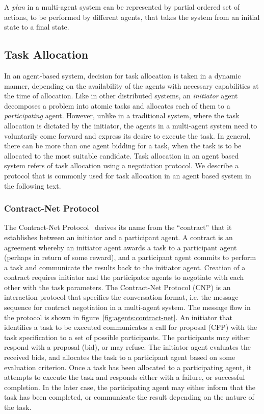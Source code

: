 \begin{definition}
A {\em plan} in a multi-agent system can be represented by partial ordered set of actions, to be performed by different agents, that 
takes the system from an initial state to a final state. 
\end{definition}

\subsection{Task Allocation}
\label{sec:agents:tasks}

In an agent-based system, decision for task allocation is taken in a dynamic manner, depending on the availability of the
agents with necessary capabilities at the time of allocation. Like in other distributed systems, an {\em initiator} agent
decomposes a problem into atomic tasks and allocates each of them to a {\em participating} agent. However, unlike in a 
traditional system, where the task allocation is dictated by the initiator, the agents in a multi-agent system need to 
voluntarily come forward and express its desire to execute the task. In general, there can be more than one agent bidding 
for a task, when the task is to be allocated to the most suitable candidate. Task allocation in an agent based system refers 
of task allocation using a negotiation protocol.
We describe a protocol that is commonly used for task allocation in an agent based system in the following text. 


\subsubsection*{Contract-Net Protocol}

The Contract-Net Protocol~\citep{Smith:1980} derives its name from the ``contract'' that it establishes between an initiator
and a participant agent. A contract is an agreement whereby an initiator agent awards a task to a participant agent (perhaps
in return of some reward), and a participant agent commits to perform a task and communicate the results back to the initiator 
agent. Creation of a contract requires initiator and the participator agents to negotiate with each other with the task parameters. 
The Contract-Net Protocol (CNP) is an interaction protocol that specifies the conversation format, i.e. the message sequence for contract 
negotiation in a multi-agent system. The message flow in the protocol is shown in figure~\ref{fig:agents:contract-net}. An initiator 
that identifies a task to be executed communicates a call for proposal (CFP) with the task specification to a set of
possible participants. The participants may either respond with a proposal (bid), or may refuse. The
initiator agent evaluates the received bids, and allocates the task to a participant agent based on some evaluation criterion.
Once a task has been allocated to a participating agent, it attempts to execute the task and responds either with a failure, or
successful completion. In the later case, the participating agent may either inform that the task has been completed, or communicate 
the result depending on the nature of the task.

